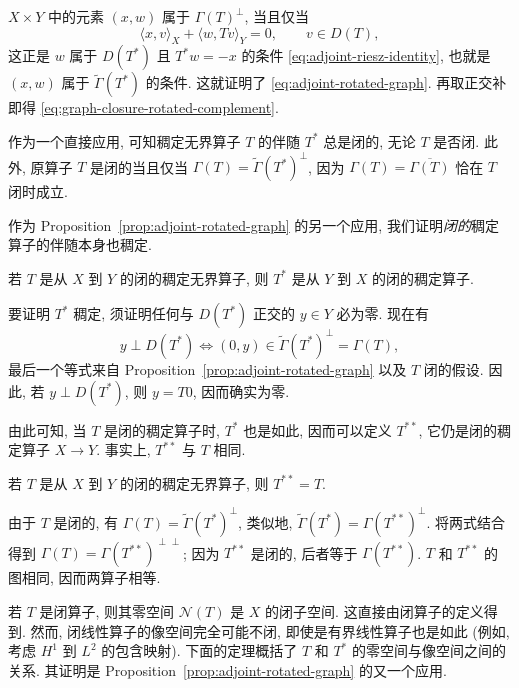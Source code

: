 \begin{Proof}
$X\times Y$ 中的元素 $(x,w)$ 属于 $\Gamma(T)^\perp$, 当且仅当
\[
\langle x,v\rangle_X+\langle w,Tv\rangle_Y=0,\qquad v\in D(T),
\]
这正是 $w$ 属于 $D(T^*)$ 且 $T^*w=-x$ 的条件 \eqref{eq:adjoint-riesz-identity}, 也就是 $(x,w)$ 属于 $\widetilde\Gamma(T^*)$ 的条件. 这就证明了 \eqref{eq:adjoint-rotated-graph}. 再取正交补即得 \eqref{eq:graph-closure-rotated-complement}.
\end{Proof}

作为一个直接应用, 可知稠定无界算子 $T$ 的伴随 $T^*$ 总是闭的, 无论 $T$ 是否闭. 此外, 原算子 $T$ 是闭的当且仅当 $\Gamma(T)=\widetilde\Gamma(T^*)^\perp$, 因为 $\Gamma(T)=\overline{\Gamma(T)}$ 恰在 $T$ 闭时成立.

作为 Proposition~\ref{prop:adjoint-rotated-graph} 的另一个应用, 我们证明\emph{闭的}稠定算子的伴随本身也稠定.

\begin{Proposition}\label{prop:closed-adjoint-densely-defined}
若 $T$ 是从 $X$ 到 $Y$ 的闭的稠定无界算子, 则 $T^*$ 是从 $Y$ 到 $X$ 的闭的稠定算子.
\end{Proposition}

\begin{Proof}
要证明 $T^*$ 稠定, 须证明任何与 $D(T^*)$ 正交的 $y\in Y$ 必为零. 现在有
\[
y\perp D(T^*)\iff(0,y)\in\widetilde\Gamma(T^*)^\perp=\Gamma(T),
\]
最后一个等式来自 Proposition~\ref{prop:adjoint-rotated-graph} 以及 $T$ 闭的假设. 因此, 若 $y\perp D(T^*)$, 则 $y=T0$, 因而确实为零.
\end{Proof}

由此可知, 当 $T$ 是闭的稠定算子时, $T^*$ 也是如此, 因而可以定义 $T^{**}$, 它仍是闭的稠定算子 $X\to Y$. 事实上, $T^{**}$ 与 $T$ 相同.

\begin{Proposition}\label{prop:double-adjoint-identity}
若 $T$ 是从 $X$ 到 $Y$ 的闭的稠定无界算子, 则 $T^{**}=T$.
\end{Proposition}

\begin{Proof}
由于 $T$ 是闭的, 有 $\Gamma(T)=\widetilde\Gamma(T^*)^\perp$, 类似地, $\widetilde\Gamma(T^*)=\Gamma(T^{**})^\perp$. 将两式结合得到 $\Gamma(T)=\Gamma(T^{**})^{\perp\perp}$; 因为 $T^{**}$ 是闭的, 后者等于 $\Gamma(T^{**})$. $T$ 和 $T^{**}$ 的图相同, 因而两算子相等.
\end{Proof}

若 $T$ 是闭算子, 则其零空间 $\mathcal N(T)$ 是 $X$ 的闭子空间. 这直接由闭算子的定义得到. 然而, 闭线性算子的像空间完全可能不闭, 即使是有界线性算子也是如此 (例如, 考虑 $H^1$ 到 $L^2$ 的包含映射). 下面的定理概括了 $T$ 和 $T^*$ 的零空间与像空间之间的关系. 其证明是 Proposition~\ref{prop:adjoint-rotated-graph} 的又一个应用.

